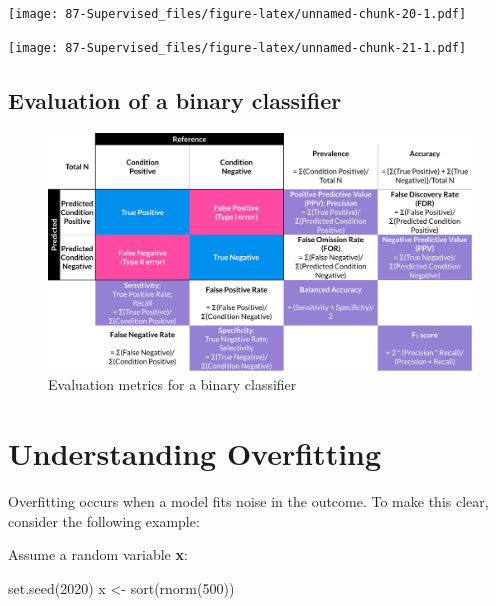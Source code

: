 \documentclass[
]{book}
\newenvironment{Shaded}{\begin{snugshade}}{\end{snugshade}}
\newcommand{\DecValTok}[1]{\textcolor[rgb]{0.00,0.00,0.81}{#1}}
\newcommand{\FunctionTok}[1]{\textcolor[rgb]{0.00,0.00,0.00}{#1}}
\newcommand{\NormalTok}[1]{#1}
\newcommand{\OtherTok}[1]{\textcolor[rgb]{0.56,0.35,0.01}{#1}}
\newcommand{\SpecialCharTok}[1]{\textcolor[rgb]{0.00,0.00,0.00}{#1}}
\begin{document}
\texttt{[image: 87-Supervised\_files/figure-latex/unnamed-chunk-20-1.pdf]}

\begin{Shaded}
\end{Shaded}

\texttt{[image: 87-Supervised\_files/figure-latex/unnamed-chunk-21-1.pdf]}

\hypertarget{evaluation-of-a-binary-classifier}{%
\subsection{Evaluation of a binary classifier}\label{evaluation-of-a-binary-classifier}}

\begin{figure}

{\centering \includegraphics[width=1\linewidth]{./Classification} 

}

\caption{Evaluation metrics for a binary classifier}\label{fig:Classification}
\end{figure}

\hypertarget{understanding-overfitting}{%
\section{Understanding Overfitting}\label{understanding-overfitting}}

Overfitting occurs when a model fits noise in the outcome. To make this clear, consider the following example:

Assume a random variable \textbf{x}:

\begin{Shaded}
\begin{Highlighting}[]
\FunctionTok{set.seed}\NormalTok{(}\DecValTok{2020}\NormalTok{)}
\NormalTok{x }\OtherTok{\textless{}{-}} \FunctionTok{sort}\NormalTok{(}\FunctionTok{rnorm}\NormalTok{(}\DecValTok{500}\NormalTok{))}
\end{Highlighting}
\end{Shaded}
\end{document}
